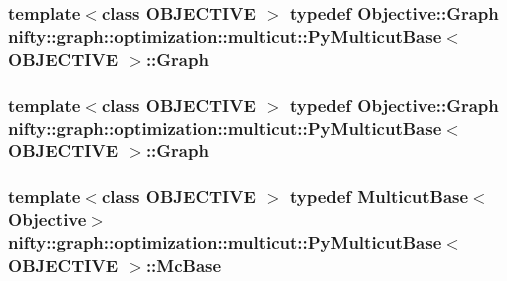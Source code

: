 \subsubsection[{Graph}]{\setlength{\rightskip}{0pt plus 5cm}template$<$class O\+B\+J\+E\+C\+T\+I\+V\+E $>$ typedef Objective\+::\+Graph {\bf nifty\+::graph\+::optimization\+::multicut\+::\+Py\+Multicut\+Base}$<$ O\+B\+J\+E\+C\+T\+I\+V\+E $>$\+::{\bf Graph}}\label{classnifty_1_1graph_1_1optimization_1_1multicut_1_1PyMulticutBase_a215eb2e3f8b280cebd5b3e78a9cbc490}
\hypertarget{classnifty_1_1graph_1_1optimization_1_1multicut_1_1PyMulticutBase_a215eb2e3f8b280cebd5b3e78a9cbc490}{}
\subsubsection[{Graph}]{\setlength{\rightskip}{0pt plus 5cm}template$<$class O\+B\+J\+E\+C\+T\+I\+V\+E $>$ typedef Objective\+::\+Graph {\bf nifty\+::graph\+::optimization\+::multicut\+::\+Py\+Multicut\+Base}$<$ O\+B\+J\+E\+C\+T\+I\+V\+E $>$\+::{\bf Graph}}\label{classnifty_1_1graph_1_1optimization_1_1multicut_1_1PyMulticutBase_a215eb2e3f8b280cebd5b3e78a9cbc490}
\hypertarget{classnifty_1_1graph_1_1optimization_1_1multicut_1_1PyMulticutBase_a775b6ff9bccc9e60c99fc6b42e7dd82f}{}
\subsubsection[{Mc\+Base}]{\setlength{\rightskip}{0pt plus 5cm}template$<$class O\+B\+J\+E\+C\+T\+I\+V\+E $>$ typedef {\bf Multicut\+Base}$<${\bf Objective}$>$ {\bf nifty\+::graph\+::optimization\+::multicut\+::\+Py\+Multicut\+Base}$<$ O\+B\+J\+E\+C\+T\+I\+V\+E $>$\+::{\bf Mc\+Base}}\label{classnifty_1_1graph_1_1optimization_1_1multicut_1_1PyMulticutBase_a775b6ff9bccc9e60c99fc6b42e7dd82f}
\hypertarget{classnifty_1_1graph_1_1optimization_1_1multicut_1_1PyMulticutBase_a775b6ff9bccc9e60c99fc6b42e7dd82f}{}
